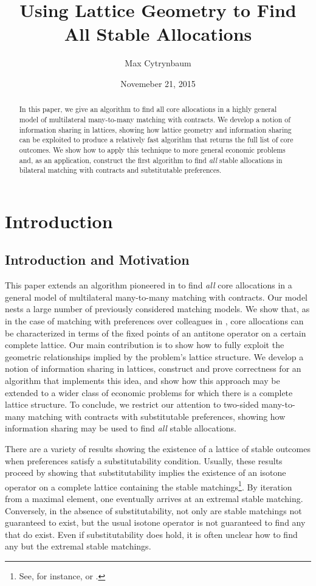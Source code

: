 \documentclass[11pt,reqno]{amsart}
\date{Novemeber 21, 2015}
\title{Using Lattice Geometry to Find All Stable Allocations}
\author{Max Cytrynbaum}
\theoremstyle{definition}
\numberwithin{equation}{section}
\begin{document}
\maketitle
\begin{abstract}
In this paper, we give an algorithm to find all core allocations in a highly general model of multilateral many-to-many matching with contracts.
We develop a notion of information sharing in lattices, showing how lattice geometry and information sharing can be exploited to produce a relatively fast algorithm that returns the full list of core outcomes.
We show how to apply this technique to more general economic problems and, as an application, construct the first algorithm to find \emph{all} stable allocations in bilateral matching with contracts and substitutable preferences. 
\end{abstract}

\section{Introduction}
\subsection{Introduction and Motivation}
This paper extends an algorithm pioneered in \cite{EcheniqueYenmez2013} to find \emph{all} core allocations in a general model of multilateral many-to-many matching with contracts.
Our model nests a large number of previously considered matching models.
We show that, as in the case of matching with preferences over colleagues in \cite{EcheniqueYenmez2013}, core allocations can be characterized in terms of the fixed points of an antitone operator on a certain complete lattice.
Our main contribution is to show how to fully exploit the geometric relationships implied by the problem's lattice structure.
We develop a notion of information sharing in lattices, construct and prove correctness for an algorithm that implements this idea, and show how this approach may be extended to a wider class of economic problems for which there is a complete lattice structure. 
To conclude, we restrict our attention to two-sided many-to-many matching with contracts with substitutable preferences, showing how information sharing may be used to find \emph{all} stable allocations.

There are a variety of results showing the existence of a lattice of stable outcomes when preferences satisfy a substitutability condition.
Usually, these results proceed by showing that substitutability implies the existence of an isotone operator on a complete lattice containing the stable matchings\footnote{See, for instance, \cite{HatfieldMilgrom2005} or \cite{HatfieldKominers2010}.}.
By iteration from a maximal element, one eventually arrives at an extremal stable matching.
Conversely, in the absence of substitutability, not only are stable matchings not guaranteed to exist, but the usual isotone operator is not guaranteed to find any that do exist.
Even if substitutability does hold, it is often unclear how to find any but the extremal stable matchings.
\end{document}
